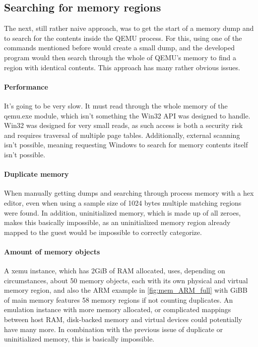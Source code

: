 \subsection{Searching for memory regions}
The next, still rather naive approach,
was to get the start of a memory dump and to search for the contents inside the QEMU process.
For this, using one of the commands mentioned before would create a small dump,
and the developed program would then search through the whole of QEMU's memory
to find a region with identical contents.
This approach has many rather obvious issues.

\paragraph{Performance} It's going to be very slow.
It must read through the whole memory of the qemu.exe module,
which isn't something the Win32 API was designed to handle.
Win32 was designed for very small reads, as such access is both a security risk
and requires traversal of multiple page tables.
Additionally, external scanning isn't possible,
meaning requesting Windows to search for memory contents itself isn't possible.

\paragraph{Duplicate memory}
When manually getting dumps and searching through process memory with a hex editor,
even when using a sample size of 1024 bytes multiple matching regions were found.
In addition, uninitialized memory, which is made up of all zeroes,
makes this basically impossible,
as an uninitialized memory region already mapped to the guest would be impossible to correctly categorize.

\paragraph{Amount of memory objects}
A xemu\cite{xemu} instance, which has 2GiB of RAM allocated, uses, depending on circumstances,
about 50 memory objects, each with its own physical and virtual memory region,
and also the ARM example in \autoref{fig:mem_ARM_full} with GiBB of main memory features 58 memory regions if not counting duplicates.
An emulation instance with more memory allocated,
or complicated mappings between host RAM, disk-backed memory and virtual devices could potentially have many more.
In combination with the previous issue of duplicate or uninitialized memory, this is basically impossible.


